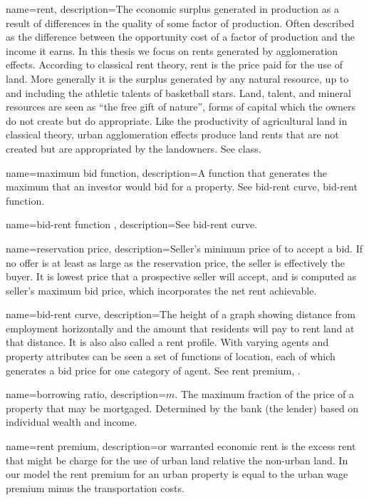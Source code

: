 {
name=rent,
description={The economic  surplus generated in production as a result of differences in the quality of some \gls{factor of production}. Often described as the difference between the opportunity cost of a factor of production and the income it earns. In this thesis we focus on rents generated by \glspl{agglomeration effect}. According to \gls{classical rent theory}, rent is the price paid for the use of land. More generally it is the  surplus generated by any natural resource, up to and including the athletic talents of basketball stars.\cite{lackmanClassicalBaseModern1976} Land, talent, and mineral resources are seen as ``the free gift of nature'', forms of capital which the owners do not create but do appropriate. Like the productivity of agricultural land in classical theory,  urban \gls{agglomeration effect}s produce land rents that are not created but are appropriated by the landowners. See \gls{class}.}
}

{
name=maximum bid function,
description={A function that generates the maximum that an investor would bid for a property.  See \gls{bid-rent curve}, \gls{bid-rent function}.}
}

{
name=bid-rent function ,
description={See \gls{bid-rent curve}.}
}

{
name=reservation price,
description={Seller's minimum price of to accept a bid. If no offer is at least as large as the reservation price, the seller is effectively the buyer. It is lowest price that a prospective seller will accept, and is computed as seller's maximum bid price, which incorporates the net rent achievable.}
}

{
name=bid-rent curve,
description={The height of a graph showing distance from employment horizontally and the amount that residents will pay to rent land at that distance. It is also also called a \gls{rent profile}. With varying agents and property attributes can be seen a set of functions of location, each of which  generates a bid price for one category of agent.   See \gls{rent premium}, .}
}

{
name=borrowing ratio,
description={$m$. The maximum fraction of the price of a property that may be mortgaged. Determined by the bank (the lender) based on individual wealth and income. }
}

{
name=rent premium,
description={or \gls{warranted economic rent} is the excess rent  that might be charge for the use of urban land relative the non-urban land. In our model the rent premium for an urban property is equal to the urban wage premium minus the transportation costs. }
}


